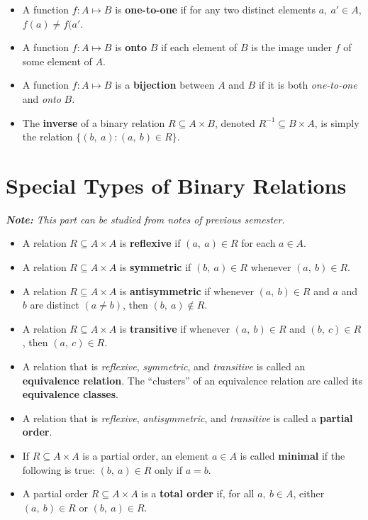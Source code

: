 \documentclass{article}
\begin{document}
\begin{multicols}{2}
\begin{itemize}
    \item A function $f: A \mapsto B$ is \textbf{one-to-one} if for any two distinct elements $a,\ a' \in A$, $f(a) \neq f(a'$.
    \item A function $f: A \mapsto B$ is \textbf{onto} $B$ if each element of $B$ is the image under $f$ of some element of $A$.
    \item A function $f: A \mapsto B$ is a \textbf{bijection} between $A$ and $B$ if it is both \textit{one-to-one} and \textit{onto} $B$.
    \item The \textbf{inverse} of a binary relation $R \subseteq A \times B$, denoted $R^{-1} \subseteq B \times A$, is simply the relation $\{(b,\ a) : (a,\ b) \in R\}$.
\end{itemize}

\section{Special Types of Binary Relations}

\textit{\textbf{Note:} This part can be studied from notes of previous semester.}

\begin{itemize}
    \item A relation $R \subseteq A \times A$ is \textbf{reflexive} if $(a,\ a) \in R$ for each $a \in A$.
    \item A relation $R \subseteq A \times A$ is \textbf{symmetric} if $(b,\ a) \in R$ whenever $(a,\ b) \in R$. 
    \item A relation $R \subseteq A \times A$ is \textbf{antisymmetric} if whenever $(a,\ b) \in R$ and $a$ and $b$ are distinct $(a \neq b)$, then $(b,\ a) \notin R$.
    \item A relation $R \subseteq A \times A$ is \textbf{transitive} if whenever $(a,\ b) \in R$ and $(b,\ c) \in R$, then $(a,\ c) \in R$.
    \item A relation that is \textit{reflexive}, \textit{symmetric}, and \textit{transitive} is called an \textbf{equivalence relation}. The ``clusters'' of an equivalence relation are called its \textbf{equivalence classes}.
    \item A relation that is \textit{reflexive}, \textit{antisymmetric}, and \textit{transitive} is called a \textbf{partial order}.
    \item If $R \subseteq A \times A$ is a partial order, an element $a \in A$ is called \textbf{minimal} if the following is true: $(b,\ a) \in R$ only if $a = b$.
    \item A partial order $R \subseteq A \times A$ is a \textbf{total order} if, for all $a,\ b \in A$, either $(a,\ b) \in R$ or $(b,\ a) \in R$.
\end{itemize}



\end{multicols}
\end{document}
